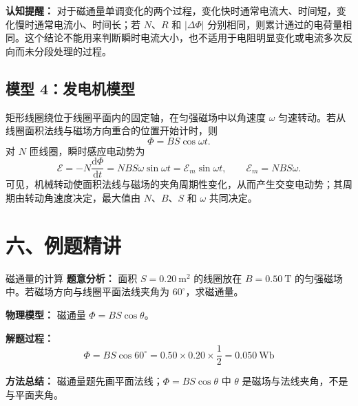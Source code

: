 \textbf{认知提醒：} 对于磁通量单调变化的两个过程，变化快时通常电流大、时间短，变化慢时通常电流小、时间长；若 $N$、$R$ 和 $|\Delta\Phi|$ 分别相同，则累计通过的电荷量相同。这个结论不能用来判断瞬时电流大小，也不适用于电阻明显变化或电流多次反向而未分段处理的过程。

\subsection*{模型 4：发电机模型}

矩形线圈绕位于线圈平面内的固定轴，在匀强磁场中以角速度 $\omega$ 匀速转动。若从线圈面积法线与磁场方向重合的位置开始计时，则
\[
\Phi=BS\cos\omega t.
\]
对 $N$ 匝线圈，瞬时感应电动势为
\[
\mathcal E=-N\frac{\mathrm d\Phi}{\mathrm dt}
=NBS\omega\sin\omega t
=\mathcal E_m\sin\omega t,
\qquad
\mathcal E_m=NBS\omega.
\]
可见，机械转动使面积法线与磁场的夹角周期性变化，从而产生交变电动势；其周期由转动角速度决定，最大值由 $N$、$B$、$S$ 和 $\omega$ 共同决定。

\begin{center}


\label{fig:generator-model}
\end{center}

\section*{六、例题精讲}

\begin{examplebox}{磁通量的计算}
\textbf{题意分析：} 面积 $S=0.20\ \mathrm{m^2}$ 的线圈放在 $B=0.50\ \mathrm{T}$ 的匀强磁场中。若磁场方向与线圈平面法线夹角为 $60^\circ$，求磁通量。

\textbf{物理模型：} 磁通量 $\Phi=BS\cos\theta$。

\textbf{解题过程：}
\[
\Phi=BS\cos60^\circ
=0.50\times0.20\times\frac12
=0.050\ \mathrm{Wb}
\]

\textbf{方法总结：} 磁通量题先画平面法线；$\Phi=BS\cos\theta$ 中 $\theta$ 是磁场与法线夹角，不是与平面夹角。
\end{examplebox}

